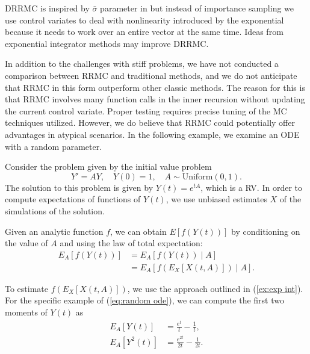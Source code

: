 \documentclass[a4paper,12pt]{article}
\begin{document}
\begin{example}[DRRMC]
\end{example}


\begin{related}[DRRMC]
    DRRMC is inspired by  $\bar{\sigma}$ parameter in \cite{sawhney_grid-free_2022} but
    instead of importance sampling  we use control variates  to deal with
    nonlinearity introduced by the exponential because it needs to work over
    an entire vector at the same time. Ideas from exponential integrator methods may
    improve DRRMC.
\end{related}

In addition to the challenges with stiff problems, we have not conducted
a comparison between RRMC and traditional methods, and we do not anticipate
that RRMC in this form outperform other classic methods.
The reason for this is that RRMC involves
many function calls in the inner recursion without updating the current control
variate. Proper testing requires precise tuning of the MC techniques utilized.
However, we do believe that RRMC could potentially offer advantages in atypical scenarios.
In the following example, we examine an ODE with a random parameter.

\begin{example} \label{ex:random ode}
    Consider the problem given by the initial value problem
    \begin{equation}\label{eq:random ode}
        Y' = AY, \quad Y(0)=1, \quad A \sim \text{Uniform}(0,1).
    \end{equation}
    The solution to this problem is given by
    $Y(t) = e^{tA}$, which is a RV.
    In order to compute expectations of functions of $Y(t)$,
    we use unbiased estimates $X$ of the simulations of the solution.

    Given an analytic function $f$, we can obtain $E[f(Y(t))]$
    by conditioning on the value of $A$ and using the
    law of total expectation:
    \begin{align}
        E_A[f(Y(t))] & = E_A[f(Y(t)) \mid A]         \\
                     & = E_A[f(E_X[X(t,A)]) \mid A].
    \end{align}

    To estimate $f(E_X[X(t,A)])$, we use the approach outlined in
    (\ref{ex:exp int}). For the specific example of (\ref{eq:random ode}),
    we can compute the first two moments of $Y(t)$ as
    \begin{align}
        E_A[Y(t)]   & = \frac{e^t}{t} - \frac{1}{t},      \\
        E_A[Y^2(t)] & = \frac{e^{2t}}{2t} - \frac{1}{2t}.
    \end{align}
\end{example}
\end{document}
